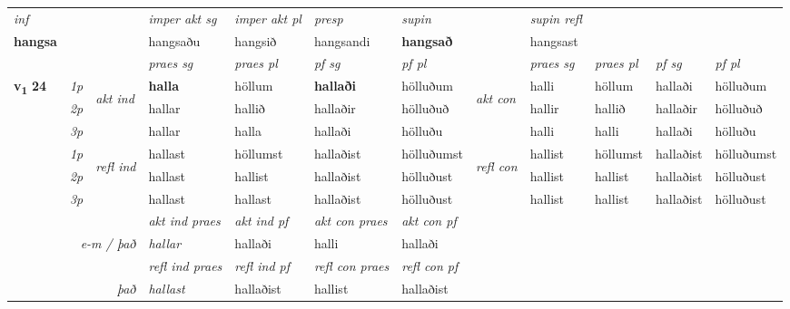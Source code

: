 \begin{longtable}[l]{X>{\footnotesize\itshape}llXXXXlXXXX}
   {\textit{inf}} & &  & \textit{imper akt sg} & \textit{imper akt pl}   & \textit{presp} & \textit{supin} && \textit{supin refl}  \\*
  {\textbf{hangsa}} & && hangsaðu  & hangsið   & hangsandi &  \textbf{hangsað} && hangsast  \\*

\midrule

 & &   & \textit{praes sg}  & \textit{praes pl}    & \textit{ pf sg} & \textit{pf pl} & & \textit{praes sg}  & \textit{praes pl}    & \textit{pf sg} & \textit{pf pl }  \\ \cmidrule{4-7} \cmidrule{9-12}
 \multirow{2}{*}{{{\textbf{v{\textsubscript{1}}} \Large{\textbf{24}}}}}  & 1p & \multirow{3}{*}{\begin{turn}{90}\textit{akt ind}\end{turn}} & \textbf{halla} & höllum & \textbf{hallaði} & hölluðum & \multirow{3}{*}{\begin{turn}{90}\textit{akt con}\end{turn}} &halli & höllum & hallaði & hölluðum\\*
 & 2p &  &  hallar  & hallið & hallaðir & hölluðuð & & hallir & hallið & hallaðir & hölluðuð \\*
 & 3p &  & hallar & halla & hallaði & hölluðu & & halli & halli& hallaði & hölluðu \\*
\cmidrule{4-7} \cmidrule{9-12}
 & 1p & \multirow{3}{*}{\begin{turn}{90}\textit{refl ind}\end{turn}}  & hallast & höllumst & hallaðist & hölluðumst & \multirow{3}{*}{\begin{turn}{90}\textit{refl con}\end{turn}}  &hallist & höllumst & hallaðist & hölluðumst \\*
 & 2p &  & hallast & hallist & hallaðist & hölluðust & &hallist & hallist & hallaðist & hölluðust \\*
 & 3p  & & hallast & hallast & hallaðist & hölluðust & & hallist & hallist& hallaðist & hölluðust \\*
\cmidrule{4-7} \cmidrule{9-12}

   && &  \textit{akt ind praes} & \textit{akt ind pf} & \textit{akt con praes} & \textit{akt con pf} \\*
\multicolumn{3}{r}{\textit{e-m / það}} & hallar & hallaði & halli & hallaði \\*

\cmidrule{4-7}
 & && \textit{refl ind praes} & \textit{refl ind pf} & \textit{refl con praes} & \textit{refl con pf} \\*
\multicolumn{3}{r}{\textit{það}}& hallast & hallaðist & hallist & hallaðist \\*


\end{longtable}
